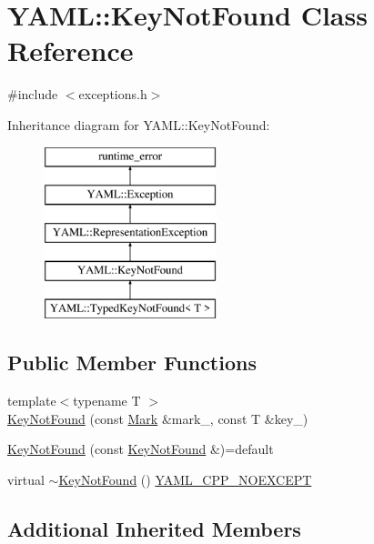 \hypertarget{class_y_a_m_l_1_1_key_not_found}{}\section{Y\+A\+ML\+::Key\+Not\+Found Class Reference}
\label{class_y_a_m_l_1_1_key_not_found}


{\ttfamily \#include $<$exceptions.\+h$>$}

Inheritance diagram for Y\+A\+ML\+::Key\+Not\+Found\+:\begin{figure}[H]
\begin{center}
\leavevmode
\includegraphics[height=5.000000cm]{class_y_a_m_l_1_1_key_not_found}
\end{center}
\end{figure}
\subsection*{Public Member Functions}
\begin{DoxyCompactItemize}
\item 
{\footnotesize template$<$typename T $>$ }\\\mbox{\hyperlink{class_y_a_m_l_1_1_key_not_found_abbd5edd424ef3feb366f31deb004407e}{Key\+Not\+Found}} (const \mbox{\hyperlink{struct_y_a_m_l_1_1_mark}{Mark}} \&mark\+\_\+, const T \&key\+\_\+)
\item 
\mbox{\hyperlink{class_y_a_m_l_1_1_key_not_found_ad7494209afc5a2603cef2bea0a07cf1c}{Key\+Not\+Found}} (const \mbox{\hyperlink{class_y_a_m_l_1_1_key_not_found}{Key\+Not\+Found}} \&)=default
\item 
virtual \mbox{\hyperlink{class_y_a_m_l_1_1_key_not_found_ab802ac941e3b82499424c4d81cecab4d}{$\sim$\+Key\+Not\+Found}} () \mbox{\hyperlink{exceptions_8cpp_a4ea58eb0a28000364858d4942add7d1a}{Y\+A\+M\+L\+\_\+\+C\+P\+P\+\_\+\+N\+O\+E\+X\+C\+E\+PT}}
\end{DoxyCompactItemize}
\subsection*{Additional Inherited Members}


